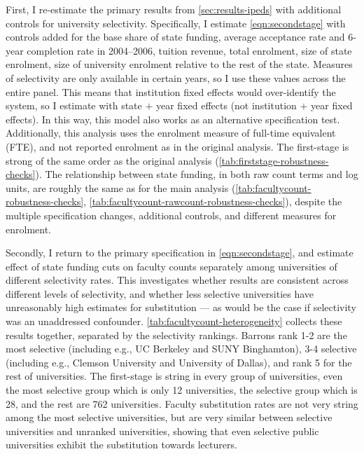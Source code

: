 First, I re-estimate the primary results from \autoref{sec:results-ipeds} with additional controls for university selectivity.
Specifically, I estimate \autoref{eqn:secondstage} with controls added for the base share of state funding, average acceptance rate and 6-year completion rate  in 2004--2006, tuition revenue, total enrolment, size of state enrolment, size of university enrolment relative to the rest of the state.
Measures of selectivity are only available in certain years, so I use these values across the entire panel.
This means that institution fixed effects would over-identify the system, so I estimate with state $+$ year fixed effects (not institution $+$ year fixed effects).
In this way, this model also works as an alternative specification test.
Additionally, this analysis uses the enrolment measure of full-time equivalent (FTE), and not reported enrolment as in the original analysis.
The first-stage is strong of the same order as the original analysis (\autoref{tab:firststage-robustness-checks}).
The relationship between state funding, in both raw count terms and log units, are roughly the same as for the main analysis (\autoref{tab:facultycount-robustness-checks}, \ref{tab:facultycount-rawcount-robustness-checks}), despite the multiple specification changes, additional controls, and different measures for enrolment.

Secondly, I return to the primary specification in \autoref{eqn:secondstage}, and estimate effect of state funding cuts on faculty counts separately among universities of different selectivity rates.
This investigates whether results are consistent across different levels of selectivity, and whether less selective universities have unreasonably high estimates for substitution --- as would be the case if selectivity was an unaddressed confounder.
\autoref{tab:facultycount-heterogeneity} collects these results together, separated by the \cite{barrons2009} selectivity rankings.
Barrons rank 1-2 are the most selective (including e.g., UC Berkeley and SUNY Binghamton), 3-4 selective (including e.g., Clemson University and University of Dallas), and rank 5 for the rest of universities.
The first-stage is string in every group of universities, even the most selective group which is only 12 universities, the selective group which is 28, and the rest are 762 universities.
Faculty substitution rates are not very string among the most selective universities, but are very similar between selective universities and unranked universities, showing that even selective public universities exhibit the substitution towards lecturers.

